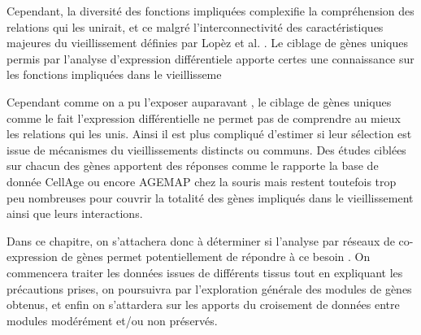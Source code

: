 



Cependant, la diversité des fonctions impliquées complexifie la compréhension des relations qui les unirait, et ce malgré l'interconnectivité des caractéristiques majeures du vieillissement définies par Lopèz et al. \cite{Lopez-Otin2013}. Le ciblage de gènes uniques permis par l'analyse d'expression différentiele apporte certes une connaissance sur les fonctions impliquées dans le vieillisseme

Cependant comme on a pu l'exposer auparavant , le ciblage de gènes uniques comme le fait l'expression différentielle ne permet pas de comprendre au mieux les relations qui les unis. Ainsi il est plus compliqué d'estimer si leur sélection est issue de mécanismes du vieillissements distincts ou communs. Des études ciblées sur chacun des gènes apportent des réponses comme le rapporte la base de donnée CellAge \cite{Avelar2019} ou encore AGEMAP chez la souris \cite{Zahn2007} mais restent toutefois trop peu nombreuses pour couvrir la totalité des gènes impliqués dans le vieillissement ainsi que leurs interactions. 

Dans ce chapitre, on s'attachera donc à déterminer si l'analyse par réseaux de co-expression de gènes permet potentiellement de répondre à ce besoin . On commencera traiter les données issues de différents tissus tout en expliquant les précautions prises, on poursuivra par l'exploration générale des modules de gènes obtenus, et enfin on s'attardera sur les apports du croisement de données entre modules modérément et/ou non préservés. 




